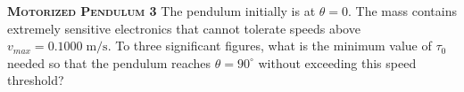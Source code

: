 \begin{problem}
\textbf{\textsc{Motorized Pendulum 3}}
The pendulum initially is at $\theta=0$. The mass contains extremely sensitive electronics that cannot tolerate speeds above $v_{max}=0.1000\;\mathrm{m/s}$. To three significant figures, what is the minimum value of $\tau_0$ needed so that the pendulum reaches $\theta=90^{\circ}$ without exceeding this speed threshold?

\end{problem}